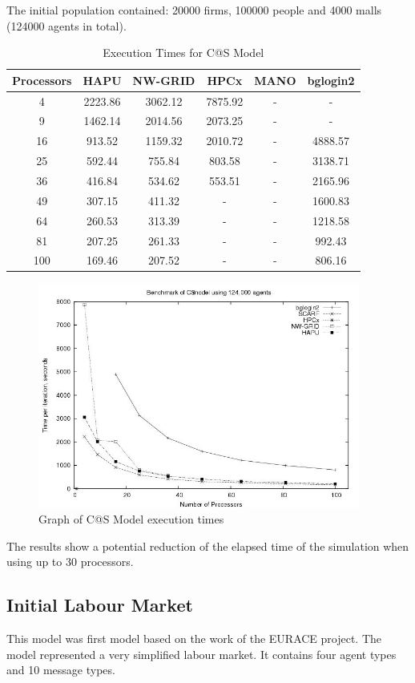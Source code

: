 The initial population contained: 20000 firms, 100000 people and 4000 malls (124000 agents in total).
{
\renewcommand{\arraystretch}{1.25}
\begin{table}[ht]
 \centering
  \begin{tabular}{c|ccccc}
 Processors &HAPU  &NW-GRID &HPCx  &MANO  &bglogin2 \\ \hline
 4   &2223.86  &3062.12  &7875.92  &-   & -  \\
 9   &1462.14  &2014.56  &2073.25  &-   &-  \\
 16   &913.52   &1159.32  &2010.72  &-   &4888.57  \\ 
 25   &592.44  &755.84   &803.58   &-   &3138.71  \\
 36   &416.84   &534.62   &553.51   &-   &2165.96  \\
 49   &307.15   &411.32   &-   &-   &1600.83  \\
 64   &260.53   &313.39   &-   &-   &1218.58  \\
 81   &207.25   &261.33   &-   &-   &992.43  \\
 100   &169.46   &207.52   &-   &-   &806.16   \\
 \end{tabular}
 \caption{Execution Times for C@S Model}
 \label{tab:ExecutionTimesForC@S}
\end{table}
}
\bigskip
\begin{figure}[ht]
 \centering
  \includegraphics[width=300pt]{C@S2-graph.jpg}
 \caption{Graph of C@S Model execution times}
 \label{fig:C@S-graph}
\end{figure}
The results show a potential reduction of the elapsed time of the simulation when using up to 30 processors.



\subsection{Initial Labour Market}
This model was first model based on the work of the EURACE project. The model represented a very simplified labour market. It contains four agent types and 10 message types.

